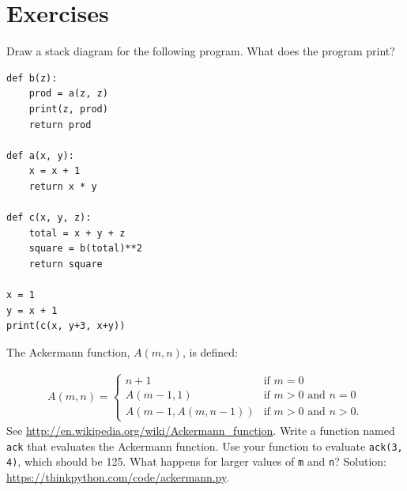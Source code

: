 \documentclass[10pt]{book}
\begin{document}
\section{Exercises}

\begin{exercise}

Draw a stack diagram for the following program.  What does the program print?

\begin{verbatim}
def b(z):
    prod = a(z, z)
    print(z, prod)
    return prod

def a(x, y):
    x = x + 1
    return x * y

def c(x, y, z):
    total = x + y + z
    square = b(total)**2
    return square

x = 1
y = x + 1
print(c(x, y+3, x+y))
\end{verbatim}

\end{exercise}


\begin{exercise}
\label{ackermann}

The Ackermann function, $A(m, n)$, is defined:

\begin{eqnarray*}
A(m, n) = \begin{cases}
              n+1 & \mbox{if } m = 0 \\
        A(m-1, 1) & \mbox{if } m > 0 \mbox{ and } n = 0 \\
A(m-1, A(m, n-1)) & \mbox{if } m > 0 \mbox{ and } n > 0.
\end{cases}
\end{eqnarray*}
%
See \url{http://en.wikipedia.org/wiki/Ackermann_function}.
Write a function named {\tt ack} that evaluates the Ackermann function.
Use your function to evaluate {\tt ack(3, 4)}, which should be 125.
What happens for larger values of {\tt m} and {\tt n}?
Solution: \url{https://thinkpython.com/code/ackermann.py}.

\end{exercise}
\end{document}
